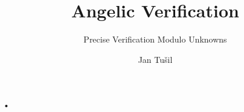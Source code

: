 \documentclass[11pt]{beamer}
\author{Jan Tušil}
\title{Angelic Verification}
\subtitle{Precise Verification Modulo Unknowns}
\begin{document}
\begin{frame}
\titlepage
\end{frame}


\begin{frame}{•}

\end{frame}
\end{document}
